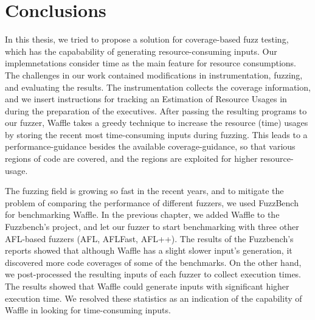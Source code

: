 \section{Conclusions}
\label{sec:conclusions}

In this thesis, we tried to propose a solution for coverage-based fuzz testing, which has the capabability of generating resource-consuming inputs. Our implemnetations consider time as the main feature for resource consumptions. The challenges in our work contained modifications in instrumentation, fuzzing, and evaluating the results. The instrumentation collects the coverage information, and we insert instructions for tracking an Estimation of Resource Usages in during the preparation of the executives. After passing the resulting programs to our fuzzer, Waffle takes a greedy technique to increase the resource (time) usages by storing the recent most time-consuming inputs during fuzzing. This leads to a performance-guidance besides the available coverage-guidance, so that various regions of code are covered, and the regions are exploited for higher resource-usage.


The fuzzing field is growing so fast in the recent years, and to mitigate the problem of comparing the performance of different fuzzers, we used FuzzBench for benchmarking Waffle. In the previous chapter, we added Waffle to the Fuzzbench's project, and let our fuzzer to start benchmarking with three other AFL-based fuzzers (AFL, AFLFast, AFL++). The results of the Fuzzbench's reports showed that although Waffle has a slight slower input's generation, it discovered more code coverages of some of the benchmarks. On the other hand, we post-processed the resulting inputs of each fuzzer to collect execution times. The results showed that Waffle could generate inputs with significant higher execution time. We resolved these statistics as an indication of the capability of Waffle in looking for time-consuming inputs.